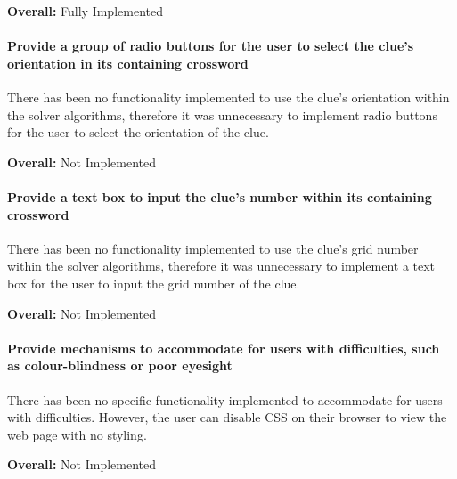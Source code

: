 {\bf Overall:} Fully Implemented


\paragraph{Provide a group of radio buttons for the user to select the clue's
orientation in its containing crossword}

There has been no functionality implemented to use the clue's orientation
within the solver algorithms, therefore it was unnecessary to implement radio
buttons for the user to select the orientation of the clue.

{\bf Overall:} Not Implemented


\paragraph{Provide a text box to input the clue's number within its containing
crossword}

There has been no functionality implemented to use the clue's grid number
within the solver algorithms, therefore it was unnecessary to implement a text
box for the user to input the grid number of the clue.
 
{\bf Overall:} Not Implemented


\paragraph{Provide mechanisms to accommodate for users with difficulties, such
as colour-blindness or poor eyesight}
    
There has been no specific functionality implemented to accommodate for  users
with difficulties. However, the user can disable CSS on their browser  to view
the web page with no styling.

{\bf Overall:} Not Implemented
